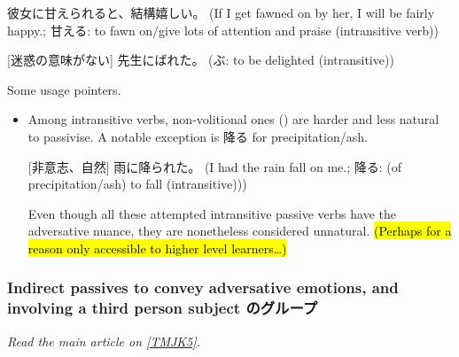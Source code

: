 \documentclass[../nihongo-gakushuu-kyouzai.tex]{subfiles}
\begin{document}
\begin{enumerate}[label=\arabic*.]
\begin{itemize}
        [迷惑の意味がない] 彼女に甘えられると、結構嬉しい。 (If I get fawned on by her, I will be fairly happy.; 甘える: to fawn on/give lots of attention and praise  (intransitive verb))

        [迷惑の意味がない] 先生にばれた。 (ぶ: to be delighted (intransitive))

    \end{itemize}

    Some usage pointers.

    \begin{itemize}
        \item Among intransitive verbs, non-volitional ones () are harder and less natural to passivise. A notable exception is 降る for precipitation/ash.

        [非意志、自然] 雨に降られた。 (I had the rain fall on me.; 降る: (of precipitation/ash) to fall (intransitive)))






        Even though all these attempted intransitive passive verbs have the adversative nuance, they are nonetheless considered unnatural. \hl{(Perhaps for a reason only accessible to higher level learners\dots)}
    \end{itemize}
\end{enumerate}


\subsubsection{Indirect passives to convey adversative emotions, and involving a third person subject のグループ} \label{sec:tmjk-5-further-indirect-passives}
\emph{Read the main article on \href{https://www.tomojuku.com/blog/passive/passive-11/}{[TMJK5]}.}
\end{document}
